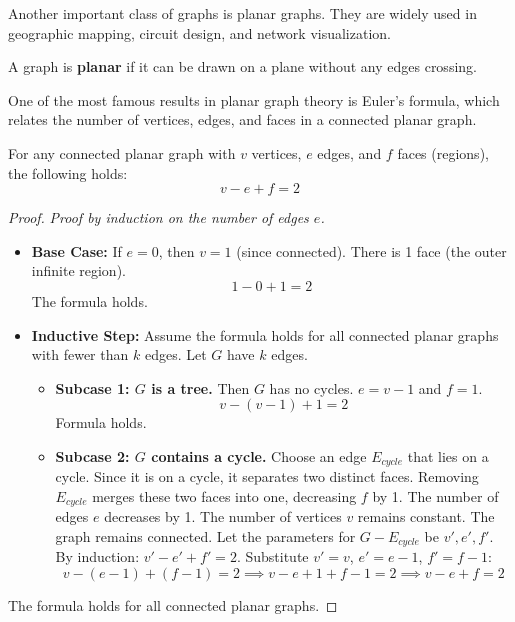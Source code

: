 \documentclass[oneside]{book}
\begin{document}
Another important class of graphs is planar graphs. They are widely used in geographic mapping, circuit design, and network visualization.

\begin{definition}
A graph is \textbf{planar} if it can be drawn on a plane without any edges crossing.
\end{definition}

One of the most famous results in planar graph theory is Euler's formula, which relates the number of vertices, edges, and faces in a connected planar graph.

\begin{theorem}
For any connected planar graph with $v$ vertices, $e$ edges, and $f$ faces (regions), the following holds:
\[ v - e + f = 2 \]
\end{theorem}

\begin{proof}
\textit{Proof by induction on the number of edges $e$.}
\begin{itemize}
    \item \textbf{Base Case:} If $e=0$, then $v=1$ (since connected). There is 1 face (the outer infinite region).
    \[ 1 - 0 + 1 = 2 \]
    The formula holds.
    \item \textbf{Inductive Step:} Assume the formula holds for all connected planar graphs with fewer than $k$ edges. Let $G$ have $k$ edges.
    \begin{itemize}
        \item \textbf{Subcase 1: $G$ is a tree.} Then $G$ has no cycles. $e = v - 1$ and $f = 1$.
        \[ v - (v-1) + 1 = 2 \]
        Formula holds.
        \item \textbf{Subcase 2: $G$ contains a cycle.} Choose an edge $E_{cycle}$ that lies on a cycle. Since it is on a cycle, it separates two distinct faces. Removing $E_{cycle}$ merges these two faces into one, decreasing $f$ by 1. The number of edges $e$ decreases by 1. The number of vertices $v$ remains constant. The graph remains connected.
        Let the parameters for $G - E_{cycle}$ be $v', e', f'$.
        By induction: $v' - e' + f' = 2$.
        Substitute $v'=v$, $e'=e-1$, $f'=f-1$:
        \[ v - (e-1) + (f-1) = 2 \implies v - e + 1 + f - 1 = 2 \implies v - e + f = 2 \]
    \end{itemize}
\end{itemize}
The formula holds for all connected planar graphs.
\end{proof}
\end{document}
